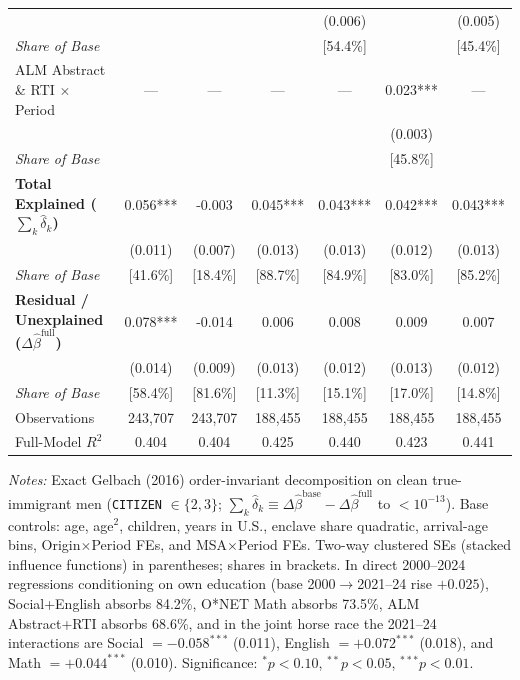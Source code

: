 \begin{table}[t!]
{\begin{tabular}{lcccccc}
 &  &  &  & (0.006) &  & (0.005) \\
\textit{\quad Share of Base} &  &  &  & [54.4\%] &  & [45.4\%] \\
ALM Abstract \& RTI $\times$ Period & --- & --- & --- & --- & 0.023*** & --- \\
 &  &  &  &  & (0.003) &  \\
\textit{\quad Share of Base} &  &  &  &  & [45.8\%] &  \\
\midrule
\textbf{Total Explained ($\sum_k \hat{\delta}_k$)} & 0.056*** & -0.003 & 0.045*** & 0.043*** & 0.042*** & 0.043*** \\
 & (0.011) & (0.007) & (0.013) & (0.013) & (0.012) & (0.013) \\
\textit{\quad Share of Base} & [41.6\%] & [18.4\%] & [88.7\%] & [84.9\%] & [83.0\%] & [85.2\%] \\
\textbf{Residual / Unexplained ($\Delta \hat{\beta}^{\text{full}}$)} & 0.078*** & -0.014 & 0.006 & 0.008 & 0.009 & 0.007 \\
 & (0.014) & (0.009) & (0.013) & (0.012) & (0.013) & (0.012) \\
\textit{\quad Share of Base} & [58.4\%] & [81.6\%] & [11.3\%] & [15.1\%] & [17.0\%] & [14.8\%] \\
\midrule
Observations & 243,707 & 243,707 & 188,455 & 188,455 & 188,455 & 188,455 \\
Full-Model $R^2$ & 0.404 & 0.404 & 0.425 & 0.440 & 0.423 & 0.441 \\
\bottomrule
\end{tabular}%
}
\begin{minipage}{0.98\textwidth}\vspace{2pt}\scriptsize
\textit{Notes:} Exact Gelbach (2016) order-invariant decomposition on clean true-immigrant men (\texttt{CITIZEN} $\in \{2,3\}$; $\sum_k \hat{\delta}_k \equiv \Delta\hat{\beta}^{\text{base}} - \Delta\hat{\beta}^{\text{full}}$ to $<10^{-13}$). Base controls: age, age$^2$, children, years in U.S., enclave share quadratic, arrival-age bins, Origin$\times$Period FEs, and MSA$\times$Period FEs. Two-way clustered SEs (stacked influence functions) in parentheses; shares in brackets. In direct 2000--2024 regressions conditioning on own education (base 2000$\to$2021--24 rise $+0.025$), Social+English absorbs 84.2\%, O*NET Math absorbs 73.5\%, ALM Abstract+RTI absorbs 68.6\%, and in the joint horse race the 2021--24 interactions are Social $=-0.058^{***}$ (0.011), English $=+0.072^{***}$ (0.018), and Math $=+0.044^{***}$ (0.010). Significance: $^{*} p<0.10$, $^{**} p<0.05$, $^{***} p<0.01$.
\end{minipage}
\end{table}